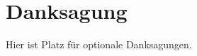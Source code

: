 




\begingroup
\let\clearpage\relax
\let\cleardoublepage\relax
\let\cleardoublepage\relax
\chapter*{Danksagung}
Hier ist Platz für optionale Danksagungen.


\endgroup
